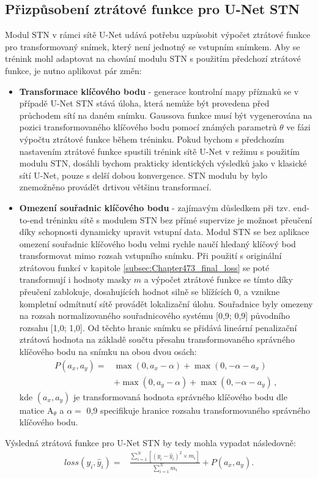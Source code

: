 \subsection{Přizpůsobení ztrátové funkce pro U-Net STN}
\label{subsec:Chapter474_stn_loss}

Modul STN v rámci sítě U-Net udává potřebu uzpůsobit výpočet ztrátové funkce pro transformovaný snímek, který není jednotný se vstupním snímkem. Aby se trénink mohl adaptovat na chování modulu STN s použitím předchozí ztrátové funkce, je nutno aplikovat pár změn:
\begin{itemize}
    \item \textbf{Transformace klíčového bodu} - generace kontrolní mapy příznaků se v případě U-Net STN stává úloha, která nemůže být provedena před průchodem sítí na daném snímku. Gaussova funkce musí být vygenerována na pozici transformovaného klíčového bodu pomocí známých parametrů $\theta$ ve fázi výpočtu ztrátové funkce během tréninku. Pokud bychom s předchozím nastavením ztrátové funkce spustili trénink sítě U-Net v režimu s použitím modulu STN, dosáhli bychom prakticky identických výsledků jako v klasické sítí U-Net, pouze s delší dobou konvergence. STN modulu by bylo znemožněno provádět drtivou většinu transformací.
    \item \textbf{Omezení souřadnic klíčového bodu} - zajímavým důsledkem při tzv. end-to-end tréninku sítě s modulem STN bez přímé supervize je možnost přeučení díky schopnosti dynamicky upravit vstupní data. Modul STN se bez aplikace omezení souřadnic klíčového bodu velmi rychle naučí hledaný klíčový bod transformovat mimo rozsah vstupního snímku. Při použití s originální ztrátovou funkcí v kapitole \ref{subsec:Chapter473_final_loss} se poté transformují i hodnoty masky $m$ a výpočet ztrátové funkce se tímto díky přeučení zablokuje, dosahujících hodnot silně se blížících 0, a vznikne kompletní odmítnutí sítě provádět lokalizační úlohu. Souřadnice byly omezeny na rozsah normalizovaného souřadnicového systému [0,9; 0,9] původního rozsahu [1,0; 1,0]. Od těchto hranic snímku se přidává lineární penalizační ztrátová hodnota na základě součtu přesahu transformovaného správného klíčového bodu na snímku na obou dvou osách:
    \begin{equation}
    \begin{aligned}
    P(a_x, a_y) = & \max(0, a_x - \alpha) + \max(0, -\alpha - a_x) \\
                  & + \max(0, a_y - \alpha) + \max(0, -\alpha - a_y)\,,
    \end{aligned}
    \end{equation}
    kde $(a_x, a_y)$ je transformovaná hodnota správného klíčového bodu dle matice ${\displaystyle \mathrm {A} }_\theta$ a $\alpha =$ 0,9 specifikuje hranice rozsahu transformovaného správného klíčového bodu.
    
\end{itemize}

Výsledná ztrátová funkce pro U-Net STN by tedy mohla vypadat následovně:
\begin{equation}
\begin{aligned}
loss(y_i, \hat{y}_i) = & \frac{\sum_{i=1}^{N} [(y_i - \hat{y}_i)^2\times m_i]}{\sum_{i=1}^{N} m_i} + P(a_x, a_y).
\end{aligned}
\end{equation}

\endinput